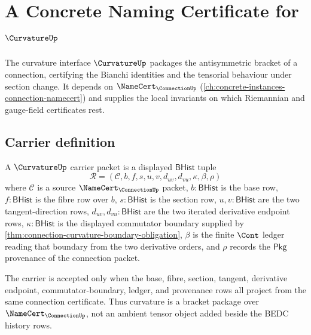 \chapter{A Concrete Naming Certificate for $\CurvatureUp$}
\label{ch:concrete-instances-curvature-namecert}

The curvature interface $\CurvatureUp$ packages the antisymmetric bracket of a connection, certifying the Bianchi identities and the tensorial behaviour under section change. It depends on $\NameCert_{\ConnectionUp}$ (\autoref{ch:concrete-instances-connection-namecert}) and supplies the local invariants on which Riemannian and gauge-field certificates rest.

\section{Carrier definition}
\label{sec:curvature-carrier}

\begin{definition}
\label{def:curvature-bhist-bracket-carrier}
A $\CurvatureUp$ carrier packet is a displayed $\mathsf{BHist}$ tuple
$$
\mathcal{R}=(\mathcal{C},b,f,s,u,v,d_{uv},d_{vu},\kappa,\beta,\rho)
$$
where $\mathcal{C}$ is a source $\NameCert_{\ConnectionUp}$ packet, $b:\mathsf{BHist}$ is the base row, $f:\mathsf{BHist}$ is the fibre row over $b$, $s:\mathsf{BHist}$ is the section row, $u,v:\mathsf{BHist}$ are the two tangent-direction rows, $d_{uv},d_{vu}:\mathsf{BHist}$ are the two iterated derivative endpoint rows, $\kappa:\mathsf{BHist}$ is the displayed commutator boundary supplied by \autoref{thm:connection-curvature-boundary-obligation}, $\beta$ is the finite $\Cont$ ledger reading that boundary from the two derivative orders, and $\rho$ records the $\mathsf{Pkg}$ provenance of the connection packet.

The carrier is accepted only when the base, fibre, section, tangent, derivative endpoint, commutator-boundary, ledger, and provenance rows all project from the same connection certificate. Thus curvature is a bracket package over $\NameCert_{\ConnectionUp}$, not an ambient tensor object added beside the BEDC history rows.
\end{definition}

